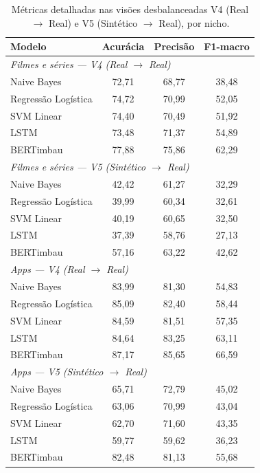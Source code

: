 \documentclass[12pt]{article}
\begin{document}
\begin{table}[H]
\centering
\footnotesize
\caption{Métricas detalhadas nas visões desbalanceadas V4 (Real $\rightarrow$ Real) e V5 (Sintético $\rightarrow$ Real), por nicho.}
\label{tab:detalhado}
\begin{tabular}{lccc}
\toprule
\textbf{Modelo} & \textbf{Acurácia} & \textbf{Precisão} & \textbf{F1-macro} \\
\midrule
\multicolumn{4}{l}{\textit{Filmes e séries — V4 (Real $\rightarrow$ Real)}} \\
Naive Bayes         & 72,71 & 68,77 & 38,48 \\
Regressão Logística & 74,72 & 70,99 & 52,05 \\
SVM Linear          & 74,40 & 70,49 & 51,92 \\
LSTM                & 73,48 & 71,37 & 54,89 \\
BERTimbau           & 77,88 & 75,86 & 62,29 \\
\midrule
\multicolumn{4}{l}{\textit{Filmes e séries — V5 (Sintético $\rightarrow$ Real)}} \\
Naive Bayes         & 42,42 & 61,27 & 32,29 \\
Regressão Logística & 39,99 & 60,34 & 32,61 \\
SVM Linear          & 40,19 & 60,65 & 32,50 \\
LSTM                & 37,39 & 58,76 & 27,13 \\
BERTimbau           & 57,16 & 63,22 & 42,62 \\
\midrule
\multicolumn{4}{l}{\textit{Apps — V4 (Real $\rightarrow$ Real)}} \\
Naive Bayes         & 83,99 & 81,30 & 54,83 \\
Regressão Logística & 85,09 & 82,40 & 58,44 \\
SVM Linear          & 84,59 & 81,51 & 57,35 \\
LSTM                & 84,64 & 83,25 & 63,11 \\
BERTimbau           & 87,17 & 85,65 & 66,59 \\
\midrule
\multicolumn{4}{l}{\textit{Apps — V5 (Sintético $\rightarrow$ Real)}} \\
Naive Bayes         & 65,71 & 72,79 & 45,02 \\
Regressão Logística & 63,06 & 70,99 & 43,04 \\
SVM Linear          & 62,70 & 71,60 & 43,35 \\
LSTM                & 59,77 & 59,62 & 36,23 \\
BERTimbau           & 82,48 & 81,13 & 55,68 \\
\bottomrule
\end{tabular}
\end{table}
\end{document}
